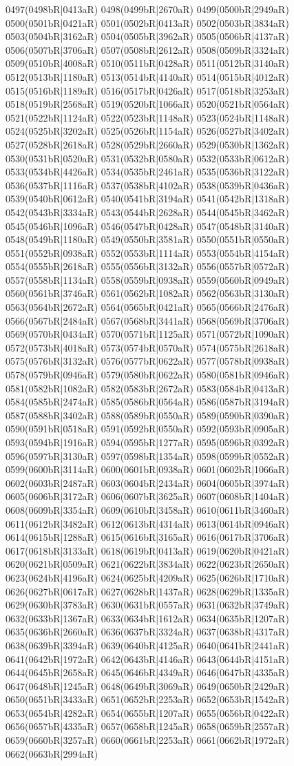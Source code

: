 0497(0498bR|0413aR) 0498(0499bR|2670aR) 0499(0500bR|2949aR) 0500(0501bR|0421aR) 0501(0502bR|0413aR) 0502(0503bR|3834aR) 0503(0504bR|3162aR) 0504(0505bR|3962aR) 0505(0506bR|4137aR) 0506(0507bR|3706aR) 0507(0508bR|2612aR) 0508(0509bR|3324aR) 0509(0510bR|4008aR) 0510(0511bR|0428aR) 0511(0512bR|3140aR) 0512(0513bR|1180aR) 0513(0514bR|4140aR) 0514(0515bR|4012aR) 0515(0516bR|1189aR) 0516(0517bR|0426aR) 0517(0518bR|3253aR) 0518(0519bR|2568aR) 0519(0520bR|1066aR) 0520(0521bR|0564aR) 0521(0522bR|1124aR) 0522(0523bR|1148aR) 0523(0524bR|1148aR) 0524(0525bR|3202aR) 0525(0526bR|1154aR) 0526(0527bR|3402aR) 0527(0528bR|2618aR) 0528(0529bR|2660aR) 0529(0530bR|1362aR) 0530(0531bR|0520aR) 0531(0532bR|0580aR) 0532(0533bR|0612aR) 0533(0534bR|4426aR) 0534(0535bR|2461aR) 0535(0536bR|3122aR) 0536(0537bR|1116aR) 0537(0538bR|4102aR) 0538(0539bR|0436aR) 0539(0540bR|0612aR) 0540(0541bR|3194aR) 0541(0542bR|1318aR) 0542(0543bR|3334aR) 0543(0544bR|2628aR) 0544(0545bR|3462aR) 0545(0546bR|1096aR) 0546(0547bR|0428aR) 0547(0548bR|3140aR) 0548(0549bR|1180aR) 0549(0550bR|3581aR) 0550(0551bR|0550aR) 0551(0552bR|0938aR) 0552(0553bR|1114aR) 0553(0554bR|4154aR) 0554(0555bR|2618aR) 0555(0556bR|3132aR) 0556(0557bR|0572aR) 0557(0558bR|1134aR) 0558(0559bR|0938aR) 0559(0560bR|0949aR) 0560(0561bR|3746aR) 0561(0562bR|1082aR) 0562(0563bR|3130aR) 0563(0564bR|2672aR) 0564(0565bR|0421aR) 0565(0566bR|2476aR) 0566(0567bR|2484aR) 0567(0568bR|3441aR) 0568(0569bR|3706aR) 0569(0570bR|0434aR) 0570(0571bR|1125aR) 0571(0572bR|1090aR) 0572(0573bR|4018aR) 0573(0574bR|0570aR) 0574(0575bR|2618aR) 0575(0576bR|3132aR) 0576(0577bR|0622aR) 0577(0578bR|0938aR) 0578(0579bR|0946aR) 0579(0580bR|0622aR) 0580(0581bR|0946aR) 0581(0582bR|1082aR) 0582(0583bR|2672aR) 0583(0584bR|0413aR) 0584(0585bR|2474aR) 0585(0586bR|0564aR) 0586(0587bR|3194aR) 0587(0588bR|3402aR) 0588(0589bR|0550aR) 0589(0590bR|0390aR) 0590(0591bR|0518aR) 0591(0592bR|0550aR) 0592(0593bR|0905aR) 0593(0594bR|1916aR) 0594(0595bR|1277aR) 0595(0596bR|0392aR) 0596(0597bR|3130aR) 0597(0598bR|1354aR) 0598(0599bR|0552aR) 0599(0600bR|3114aR) 0600(0601bR|0938aR) 0601(0602bR|1066aR) 0602(0603bR|2487aR) 0603(0604bR|2434aR) 0604(0605bR|3974aR) 0605(0606bR|3172aR) 0606(0607bR|3625aR) 0607(0608bR|1404aR) 0608(0609bR|3354aR) 0609(0610bR|3458aR) 0610(0611bR|3460aR) 0611(0612bR|3482aR) 0612(0613bR|4314aR) 0613(0614bR|0946aR) 0614(0615bR|1288aR) 0615(0616bR|3165aR) 0616(0617bR|3706aR) 0617(0618bR|3133aR) 0618(0619bR|0413aR) 0619(0620bR|0421aR) 0620(0621bR|0509aR) 0621(0622bR|3834aR) 0622(0623bR|2650aR) 0623(0624bR|4196aR) 0624(0625bR|4209aR) 0625(0626bR|1710aR) 0626(0627bR|0617aR) 0627(0628bR|1437aR) 0628(0629bR|1335aR) 0629(0630bR|3783aR) 0630(0631bR|0557aR) 0631(0632bR|3749aR) 0632(0633bR|1367aR) 0633(0634bR|1612aR) 0634(0635bR|1207aR) 0635(0636bR|2660aR) 0636(0637bR|3324aR) 0637(0638bR|4317aR) 0638(0639bR|3394aR) 0639(0640bR|4125aR) 0640(0641bR|2441aR) 0641(0642bR|1972aR) 0642(0643bR|4146aR) 0643(0644bR|4151aR) 0644(0645bR|2658aR) 0645(0646bR|4349aR) 0646(0647bR|4335aR) 0647(0648bR|1245aR) 0648(0649bR|3069aR) 0649(0650bR|2429aR) 0650(0651bR|3433aR) 0651(0652bR|2253aR) 0652(0653bR|1542aR) 0653(0654bR|4282aR) 0654(0655bR|1207aR) 0655(0656bR|0422aR) 0656(0657bR|4335aR) 0657(0658bR|1245aR) 0658(0659bR|2557aR) 0659(0660bR|3257aR) 0660(0661bR|2253aR) 0661(0662bR|1972aR) 0662(0663bR|2994aR) 